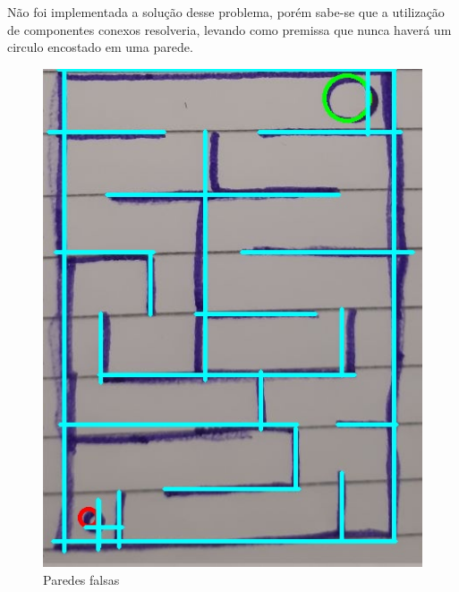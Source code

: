 \documentclass[conference]{IEEEtran}
\begin{document}
    Não foi implementada a solução desse problema, porém sabe-se que a utilização de componentes conexos resolveria, levando como premissa que nunca haverá um circulo encostado em uma parede.
     \begin{figure}[h!]
          \centering
            \includegraphics[scale=0.3]{lineImagemedium.jpg}
            \caption{Paredes falsas}
        \end{figure}
\end{document}
